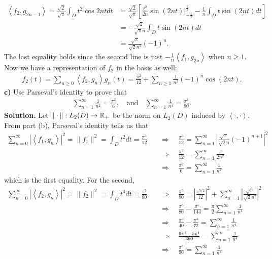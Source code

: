 \documentclass[10pt]{article}
\newcommand{\1}[1]{\mathbbm{1}_{#1}} \newcommand{\mc}[1]{\mathcal{#1}}
\newcommand{\ip}[2]{\left\langle#1,#2\right\rangle }
\begin{document}
    \begin{align*}
        \ip{f_2}{g_{2n-1}}=\frac{\sqrt{2}}{\sqrt{\pi}}\int_Dt^2\cos{2nt}dt&=\frac{\sqrt{2}}{\sqrt{\pi}}\left[\frac{t^2}{2n}\sin(2nt)\bigg|^{\frac{\pi}{2}}_{-\frac{\pi}{2}}-\frac{1}{n}\int_Dt\sin(2nt)dt\right]\\
        &=-\frac{\sqrt{2}}{\sqrt{\pi}n}\int_Dt\sin(2nt)dt\\
        &=\frac{\sqrt{\pi}}{\sqrt{2}n^2}(-1)^n.
    \end{align*}
    The last equality holds since the second line is just $-\frac{1}{n}\ip{f_1}{g_{2n}}$ when $n\geq 1$. Now we have a representation of $f_2$ in the basis as well:
    \begin{align*}
        f_2(t)=\sum_{n\geq 0}\ip{f_2}{g_n}g_n(t)=\frac{\pi^{2}}{12}+\sum_{n\geq 1}\frac{1}{n^2}(-1)^n\cos(2nt).\tag*{$\qed$}
    \end{align*}
    {\bf c)} Use Parseval's identity to prove that
    \begin{align*}
        \sum_{n=1}^\infty\frac{1}{n^2}=\frac{\pi^2}{6},\quad\text{and}\quad\sum_{n=1}^\infty\frac{1}{n^4}=\frac{\pi^4}{90}.
    \end{align*}
    {\bf Solution.} Let $\|\cdot\|:L_2(D)\rightarrow\mathbb{R}_+$ be the norm on $L_2(D)$ induced by $\ip{\cdot}{\cdot}$. From part (b), Parseval's identity tells us that
    \begin{align*}
        \sum_{n=0}^\infty|\ip{f_1}{g_n}|^2=\|f_1\|^2=\int_Dt^2dt=\frac{\pi^3}{12}\quad&\Rightarrow\quad \frac{\pi^3}{12}=\sum_{n=1}^\infty\left|\frac{\sqrt{\pi}}{\sqrt{2}n}(-1)^{n+1}\right|^2\\
        &\Rightarrow\quad\frac{\pi^3}{12}=\sum_{n=1}^\infty \frac{\pi}{2n^2}\\
        &\Rightarrow\quad\frac{\pi^2}{6}=\sum_{n=1}^\infty\frac{1}{n^2}
    \end{align*}
    which is the first equality. For the second, 
    \begin{align*}
        \sum_{n=0}^\infty|\ip{f_2}{g_n}|^2=\|f_2\|^2=\int_Dt^4dt=\frac{\pi^5}{80}\quad&\Rightarrow\quad\frac{\pi^5}{80}=\left|\frac{\pi^{5/2}}{12}\right|^2+\sum_{n=1}^\infty\left|\frac{\sqrt{\pi}}{\sqrt{2}n^2}\right|^2\\
        &\Rightarrow\quad\frac{\pi^5}{80}-\frac{\pi^5}{144}=\frac{\pi}{2}\sum_{n=1}^\infty\frac{1}{n^4}\\
        &\Rightarrow\quad\frac{\pi^4}{40}-\frac{\pi^4}{72}=\sum_{n=1}^\infty\frac{1}{n^4}\\
        &\Rightarrow\quad\frac{9\pi^4-5\pi^4}{360}=\sum_{n=1}^\infty\frac{1}{n^4}\\
        &\Rightarrow\quad\frac{\pi^4}{90}=\sum_{n=1}^\infty\frac{1}{n^4}
    \end{align*}
\end{document}
